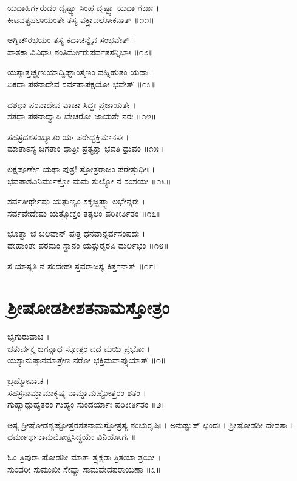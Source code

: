 ಯಥಾಹಿರ್ಗರುಡಂ ದೃಷ್ಟ್ವಾ ಸಿಂಹ ದೃಷ್ಟ್ವಾ ಯಥಾ ಗಜಾಃ ।\\
ಕೀಟವತ್ಪ್ರಪಲಾಯಂತೇ ತಸ್ಯ ವಕ್ತ್ರಾವಲೋಕನಾತ್ ॥೧೧॥

ಅಗ್ನಿಚೌರಭಯಂ ತಸ್ಯ ಕದಾಚಿನ್ನೈವ ಸಂಭವೇತ್ ।\\
ಪಾತಕಾ ವಿವಿಧಾಃ ಶಂತಿರ್ಮೇರುಪರ್ವತಸನ್ನಿಭಾಃ ॥೧೨॥

ಯಸ್ಮಾತ್ತಚ್ಛೃಣುಯಾದ್ವಿಘ್ನಾಂಸ್ತೃಣಂ ವಹ್ನಿಹುತಂ ಯಥಾ ।\\
ಏಕದಾ ಪಠನಾದೇವ ಸರ್ವಪಾಪಕ್ಷಯೋ ಭವೇತ್ ॥೧೩॥

ದಶಧಾ ಪಠನಾದೇವ ವಾಚಾ ಸಿದ್ಧಃ ಪ್ರಜಾಯತೇ ।\\
ಶತಧಾ ಪಠನಾದ್ವಾಪಿ ಖೇಚರೋ ಜಾಯತೇ ನರಃ ॥೧೪॥

ಸಹಸ್ರದಶಸಂಖ್ಯಾತಂ ಯಃ ಪಠೇದ್ಭಕ್ತಿಮಾನಸಃ ।\\
ಮಾತಾಽಸ್ಯ ಜಗತಾಂ ಧಾತ್ರೀ ಪ್ರತ್ಯಕ್ಷಾ ಭವತಿ ಧ್ರುವಂ ॥೧೫॥

ಲಕ್ಷಪೂರ್ಣೇ ಯಥಾ ಪುತ್ರ! ಸ್ತೋತ್ರರಾಜಂ ಪಠೇತ್ಸುಧೀಃ ।\\
ಭವಪಾಶವಿನಿರ್ಮುಕ್ತೋ ಮಮ ತುಲ್ಯೋ ನ ಸಂಶಯಃ ॥೧೬॥

ಸರ್ವತೀರ್ಥೇಷು ಯತ್ಪುಣ್ಯಂ ಸಕೃಜ್ಜಪ್ತ್ವಾ ಲಭೇನ್ನರಃ ।\\
ಸರ್ವವೇದೇಷು ಯತ್ಪ್ರೋಕ್ತಂ ತತ್ಫಲಂ ಪರಿಕೀರ್ತಿತಂ ॥೧೭॥

ಭೂತ್ವಾ ಚ ಬಲವಾನ್ ಪುತ್ರ ಧನವಾನ್ಸರ್ವಸಂಪದಃ ।\\
ದೇಹಾಂತೇ ಪರಮಂ ಸ್ಥಾನಂ ಯತ್ಸುರೈರಪಿ ದುರ್ಲಭಂ ॥೧೮॥

ಸ ಯಾಸ್ಯತಿ ನ ಸಂದೇಹಃ ಸ್ತವರಾಜಸ್ಯ ಕಿರ್ತ್ತನಾತ್ ॥೧೯॥


\section{ಶ್ರೀಷೋಡಶೀಶತನಾಮಸ್ತೋತ್ರಂ}


ಭೃಗುರುವಾಚ ।\\
ಚತುರ್ವಕ್ತ್ರ ಜಗನ್ನಾಥ ಸ್ತೋತ್ರಂ ವದ ಮಯಿ ಪ್ರಭೋ ।\\
ಯಸ್ಯಾನುಷ್ಠಾನಮಾತ್ರೇಣ ನರೋ ಭಕ್ತಿಮವಾಪ್ನುಯಾತ್ ॥೧॥

ಬ್ರಹ್ಮೋವಾಚ ।\\
ಸಹಸ್ರನಾಮ್ನಾಮಾಕೃಷ್ಯ ನಾಮ್ನಾಮಷ್ಟೋತ್ತರಂ ಶತಂ ।\\
ಗುಹ್ಯಾದ್ಗುಹ್ಯತರಂ ಗುಹ್ಯಂ ಸುಂದರ್ಯಾಃ ಪರಿಕೀರ್ತಿತಂ ॥೨॥

ಅಸ್ಯ ಶ್ರೀಷೋಡಶ್ಯಷ್ಟೋತ್ತರಶತನಾಮಸ್ತೋತ್ರಸ್ಯ ಶಂಭುರೃಷಿಃ । ಅನುಷ್ಟುಪ್ ಛಂದಃ । ಶ್ರೀಷೋಡಶೀ ದೇವತಾ । ಧರ್ಮಾರ್ಥಕಾಮಮೋಕ್ಷಸಿದ್ಧಯೇ ವಿನಿಯೋಗಃ ॥

ಓಂ ತ್ರಿಪುರಾ ಷೋಡಶೀ ಮಾತಾ ತ್ರ್ಯಕ್ಷರಾ ತ್ರಿತಯಾ ತ್ರಯೀ ।\\
ಸುಂದರೀ ಸುಮುಖೀ ಸೇವ್ಯಾ ಸಾಮವೇದಪರಾಯಣಾ ॥೩॥

